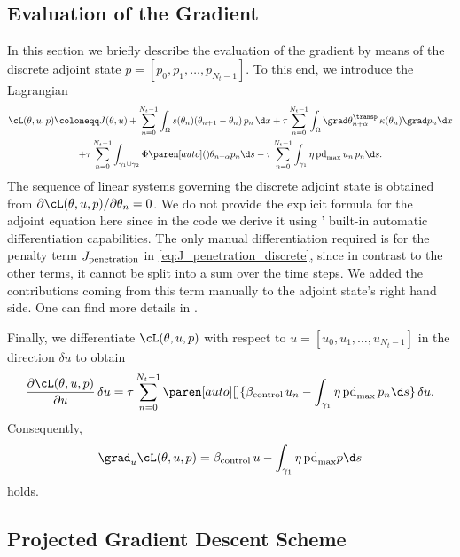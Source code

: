 \subsection{Evaluation of the Gradient}

In this section we briefly describe the evaluation of the gradient by means of the discrete adjoint state $p = [p_0, p_1, \ldots, p_{N_t-1}]$.
To this end, we introduce the Lagrangian 
\begin{multline} \label{eq:lagrange}
	\cL(\theta,u,p) \coloneqq
	J(\theta,u)
	+
	\sum_{n=0}^{N_t-1}\int_{\Omega} s(\theta_n) (\theta_{n+1}-\theta_n) \, p_n \, \d x
	+ 
	\tau \sum_{n=0}^{N_t-1}\int_{\Omega} \grad \theta_{n+\alpha}^\transp \, \kappa(\theta_n) \grad p_n \d x
	\\
	+ 
	\tau \sum_{n=0}^{N_t-1}\int_{\gamma_1 \cup \gamma_2} \Phi \paren[auto](){\theta_{n+\alpha}} p_n \d s
	- 
	\tau \sum_{n=0}^{N_t-1}\int_{\gamma_1} \eta \, \text{pd}_{\max} \, u_n \, p_n \d s.
\end{multline}
The sequence of linear systems governing the discrete adjoint state is obtained from $\partial \cL(\theta,u,p)/\partial \theta_n = 0$.
We do not provide the explicit formula for the adjoint equation here since in the code we derive it using \fenics' built-in automatic differentiation capabilities.
The only manual differentiation required is for the penalty term $J_\textup{penetration}$ in \eqref{eq:J_penetration_discrete}, since in contrast to the other terms, it cannot be split into a sum over the time steps.
We added the contributions coming from this term manually to the adjoint state's right hand side.
One can find more details in \cite[\texttt{optipuls.core}]{optipuls_github}.

Finally, we differentiate $\cL(\theta,u,p)$ with respect to $u = [u_0, u_1, \ldots, u_{N_t-1}]$ in the direction $\delta u$ to obtain
\begin{equation}
	\frac{\partial \cL(\theta,u,p)}{\partial u} \, \delta u
	=
	\tau \sum_{n=0}^{N_t-1}
	\paren[auto][]{\beta_\textup{control} \, u_n - \int_{\gamma_1} \eta \, \text{pd}_{\max} \, p_n \d s} \, \delta u
	.
\end{equation}
Consequently,
\begin{equation} \label{eq:gradient}
	\grad_u \cL(\theta, u, p) 
	= 
	\beta_\textup{control}\, u - \int_{\gamma_1} \eta \, \text{pd}_{\max} p \d s
\end{equation}
holds.


\subsection{Projected Gradient Descent Scheme}

